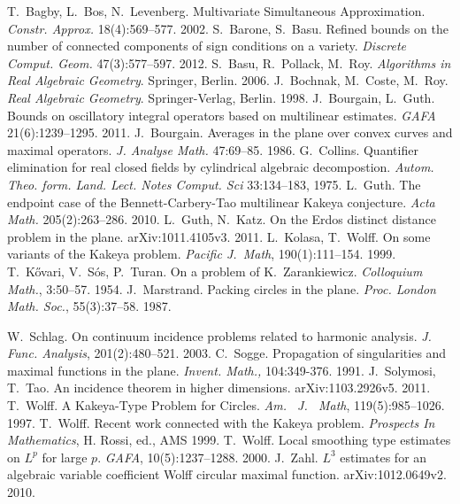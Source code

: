 \documentclass[reqno]{amsart}
\theoremstyle{definition}
\theoremstyle{remark}
\theoremstyle{remark}
\begin{document}
\begin{thebibliography}{99}
 T.~Bagby, L.~Bos, N.~Levenberg. Multivariate Simultaneous Approximation. \emph{Constr. Approx.} 18(4):569--577. 2002.
%
%
 S.~Barone, S.~Basu. Refined bounds on the number of connected components of sign conditions on a variety. \emph{Discrete Comput. Geom.} 47(3):577--597. 2012.
%
 S.~Basu, R.~Pollack, M.~Roy. \emph{Algorithms in Real Algebraic Geometry}. Springer, Berlin. 2006.
%
 J.~Bochnak, M.~Coste, M.~Roy. \emph{Real Algebraic Geometry}. Springer-Verlag, Berlin. 1998.
%
 J.~Bourgain, L.~Guth. Bounds on oscillatory integral operators based on multilinear estimates. \emph{GAFA} 21(6):1239--1295. 2011.
%
%
 J.~Bourgain. Averages in the plane over convex curves and maximal operators. \emph{J. Analyse Math.} 47:69--85. 1986.
%
%
%
%
 G.~Collins. Quantifier elimination for real closed fields by cylindrical algebraic decompostion. \emph{Autom. Theo. form. Land. Lect. Notes Comput. Sci} 33:134--183, 1975.
%
%
 L.~Guth. The endpoint case of the Bennett-Carbery-Tao multilinear Kakeya conjecture. \emph{Acta Math.} 205(2):263--286. 2010.
%
%
  L.~Guth, N.~Katz. On the Erdos distinct distance problem in the plane. arXiv:1011.4105v3. 2011.
%
%
 L.~Kolasa, T.~Wolff. On some variants of the Kakeya problem. \emph{Pacific J.~Math}, 190(1):111--154. 1999.
%
%
%
 T.~K\H{o}vari, V.~S\'os, P.~Turan. On a problem of K.~Zarankiewicz. \emph{Colloquium Math.}, 3:50--57. 1954.
 J.~Marstrand. Packing circles in the plane. \emph{Proc. London Math. Soc.}, 55(3):37--58. 1987.

 W.~Schlag. On continuum incidence problems related to harmonic analysis. \emph{J. Func. Analysis}, 201(2):480--521. 2003.
 C.~Sogge. Propagation of singularities and maximal functions in the plane. \emph{Invent. Math.,} 104:349-376. 1991.
 J.~Solymosi, T.~Tao. An incidence theorem in higher dimensions. arXiv:1103.2926v5. 2011.
%
%
 T.~Wolff. A Kakeya-Type Problem for Circles. \emph{Am.~ J.~ Math}, 119(5):985--1026. 1997.
 T.~Wolff. Recent work connected with the Kakeya problem. \emph{Prospects In Mathematics}, H. Rossi, ed., AMS 1999.
 T.~Wolff. Local smoothing type estimates on $L^p$ for large $p$. \emph{GAFA}, 10(5):1237--1288. 2000.
%
%
 J.~Zahl. $L^3$ estimates for an algebraic variable coefficient Wolff circular maximal function. arXiv:1012.0649v2. 2010.
\end{thebibliography}
\end{document}

